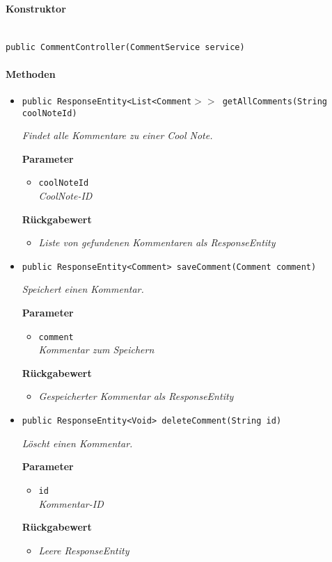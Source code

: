     \paragraph*{Konstruktor}\mbox{} \\
     \texttt{public CommentController(CommentService service)}
     \paragraph*{Methoden}
     \begin{itemize}
     	\item{\texttt{public ResponseEntity<List<Comment$>>$ getAllComments(String coolNoteId)}}
     	
     	\textit{Findet alle Kommentare zu einer Cool Note.}
     	
     	\textbf{Parameter}
     	\begin{itemize}
     		\item\texttt{coolNoteId}\\
     		\textit{CoolNote-ID}
     	\end{itemize}
     	
     	\textbf{Rückgabewert}
     	\begin{itemize}
     		\item\textit{Liste von gefundenen Kommentaren als ResponseEntity} 
     	\end{itemize}
     
     	\item{\texttt{public ResponseEntity<Comment> saveComment(Comment comment)}}
     	
     	\textit{Speichert einen Kommentar.}
     	
     	\textbf{Parameter}
     	\begin{itemize}
     		\item\texttt{comment}\\
     		\textit{Kommentar zum Speichern}
     	\end{itemize}
     	
     	\textbf{Rückgabewert}
     	\begin{itemize}
     		\item\textit{Gespeicherter Kommentar als ResponseEntity}
     	\end{itemize}        
     
     \item{\texttt{public ResponseEntity<Void> deleteComment(String id)}}
     	
     	\textit{Löscht einen Kommentar.}
     	
     	\textbf{Parameter}
     	\begin{itemize}
     		\item\texttt{id}\\
     		\textit{Kommentar-ID} 
     	\end{itemize}
     	
     	\textbf{Rückgabewert}
     	\begin{itemize}
     		\item\textit{Leere ResponseEntity} 
     	\end{itemize}
     \end{itemize}
 
